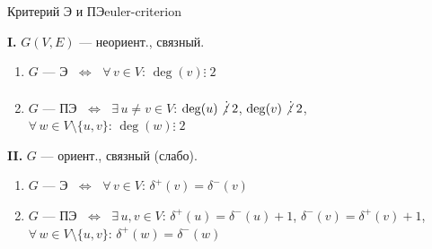 \begin{statement}{Критерий Э и ПЭ}{euler-criterion}

\textbf{I.} $G(V,E)$ --- неориент., связный.

\begin{enumerate}[label=\alph*)]
  \item $G$ --- Э $\;\Leftrightarrow\;$ $\forall\, v \in V$: $\deg(v) \vdots\; 2$
  \item $G$ --- ПЭ $\;\Leftrightarrow\;$ $\exists\, u \neq v \in V$: $\operatorname{deg}(u) \mathrel{\not\vdots} 2$,\; $\operatorname{deg}(v) \mathrel{\not\vdots} 2$, \\
        $\forall\, w \in V \setminus \{u, v\}$: $\deg(w) \vdots\; 2$
\end{enumerate}

\textbf{II.} $G$ --- ориент., связный (слабо).

\begin{enumerate}[label=\alph*)]
  \item $G$ --- Э $\;\Leftrightarrow\;$ $\forall\, v \in V$: $\delta^+(v) = \delta^-(v)$
  \item $G$ --- ПЭ $\;\Leftrightarrow\;$ $\exists\, u, v \in V$:
        $\delta^+(u) = \delta^-(u) + 1$,\;
        $\delta^-(v) = \delta^+(v) + 1$, \\
        $\forall\, w \in V \setminus \{u, v\}$: $\delta^+(w) = \delta^-(w)$
\end{enumerate}
\end{statement}


